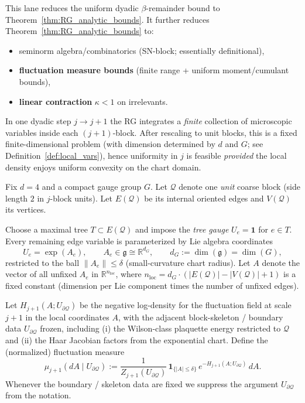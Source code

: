 This lane reduces the uniform dyadic $\beta$-remainder bound to Theorem~\ref{thm:RG_analytic_bounds}.
It further reduces Theorem~\ref{thm:RG_analytic_bounds} to:
\begin{itemize}
\item seminorm algebra/combinatorics (SN-block; essentially definitional),
\item \textbf{fluctuation measure bounds} (finite range + uniform moment/cumulant bounds),
\item \textbf{linear contraction} $\kappa<1$ on irrelevants.
\end{itemize}

In one dyadic step $j\to j+1$ the RG integrates a \emph{finite} collection of microscopic variables inside each $(j+1)$-block.
After rescaling to unit blocks, this is a fixed finite-dimensional problem (with dimension determined by $d$ and $G$; see Definition~\ref{def:local_vars}), hence uniformity in $j$
is feasible \emph{provided} the local density enjoys uniform convexity on the chart domain.

\begin{definition}\label{def:local_vars}
Fix $d=4$ and a compact gauge group $G$. Let $\mathcal Q$ denote one \emph{unit} coarse block (side length $2$ in $j$-block units).
Let $E(\mathcal Q)$ be its internal oriented edges and $V(\mathcal Q)$ its vertices.

Choose a maximal tree $T\subset E(\mathcal Q)$ and impose the \emph{tree gauge} $U_e=\mathbf 1$ for $e\in T$.
Every remaining edge variable is parameterized by Lie algebra coordinates
\[
U_e=\exp(A_e),\qquad A_e\in\mathfrak g\cong \mathbb R^{d_G},\qquad d_G:=\dim(\mathfrak g)=\dim(G),
\]
restricted to the ball $\|A_e\|\le \delta$ (small-curvature chart radius).
Let $A$ denote the vector of all unfixed $A_e$ in $\mathbb R^{n_{\mathrm{loc}}}$, where
$n_{\mathrm{loc}}=d_G\cdot (|E(\mathcal Q)|-|V(\mathcal Q)|+1)$ is a fixed constant (dimension per Lie component times the number of unfixed edges).
\end{definition}

\begin{definition}\label{def:fluc_density}
Let $H_{j+1}(A;U_{\partial\mathcal Q})$ be the negative log-density for the fluctuation field at scale $j+1$ in the local coordinates $A$,
with the adjacent block-skeleton / boundary data $U_{\partial\mathcal Q}$ frozen, including (i) the Wilson-class plaquette energy restricted to $\mathcal Q$ and (ii) the Haar Jacobian factors from the exponential chart.
Define the (normalized) fluctuation measure
\[
\mu_{j+1}(dA\mid U_{\partial\mathcal Q})
:=\frac{1}{Z_{j+1}(U_{\partial\mathcal Q})}\,\mathbf 1_{\{|A|\le \delta\}}\,e^{-H_{j+1}(A;U_{\partial\mathcal Q})}\,dA.
\]
Whenever the boundary / skeleton data are fixed we suppress the argument $U_{\partial\mathcal Q}$ from the notation.
\end{definition}

